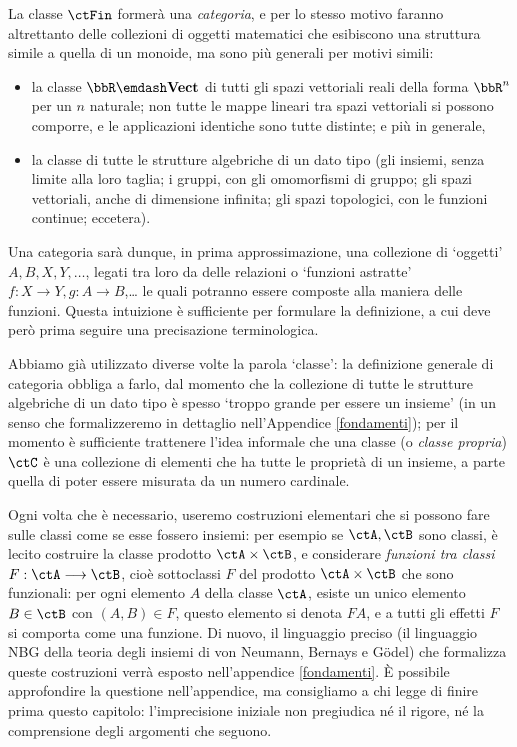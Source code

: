 \begin{example}
	La classe \(\ctFin\) formerà una \emph{categoria}, e per lo stesso motivo faranno altrettanto delle collezioni di oggetti matematici che esibiscono una struttura simile a quella di un monoide, ma sono più generali per motivi simili:
	\begin{itemize}
		\item {} la classe \(\bbR\emdash\ctVect\) di tutti gli spazi vettoriali reali della forma \(\bbR^n\) per un \(n\) %
		      naturale; non tutte le mappe lineari tra spazi vettoriali si possono comporre, e le applicazioni identiche sono tutte distinte; e più in generale,
		\item la classe di tutte le strutture algebriche di un dato tipo (gli insiemi, senza limite alla loro taglia; i gruppi, con gli omomorfismi di gruppo; gli spazi vettoriali, anche di dimensione infinita; gli spazi topologici, con le funzioni continue; eccetera).
	\end{itemize}
\end{example}
Una categoria sarà dunque, in prima approssimazione, una collezione di `oggetti' \(A,B,X,Y,\dots\), legati tra loro da delle relazioni o `funzioni astratte' \(f : X\to Y, g : A\to B\),\dots{} le quali potranno essere composte alla maniera delle funzioni. Questa intuizione è sufficiente per formulare la definizione, a cui deve però prima seguire una precisazione terminologica.
\begin{remark}
	Abbiamo già utilizzato diverse volte la parola `classe': la definizione generale di categoria obbliga a farlo, dal momento che la collezione di tutte le strutture algebriche di un dato tipo è spesso `troppo grande per essere un insieme' (in un senso che formalizzeremo in dettaglio nell'Appendice \ref{fondamenti}); per il momento è sufficiente trattenere l'idea informale che una classe (o \emph{classe propria}) \(\ctC\) è una collezione di elementi che ha tutte le proprietà di un insieme, a parte quella di poter essere misurata da un numero cardinale.

	Ogni volta che è necessario, useremo costruzioni elementari che si possono fare sulle classi come se esse fossero insiemi: per esempio se \(\ctA,\ctB\) sono classi, è lecito costruire la classe prodotto \(\ctA\times\ctB\), e considerare \emph{funzioni tra classi} \(F : \ctA\fun\ctB\), cioè sottoclassi \(F\) del prodotto \(\ctA\times\ctB\) che sono funzionali: per ogni elemento \(A\) della classe \(\ctA\), esiste un unico elemento \(B\in\ctB\) con \((A,B)\in F\), questo elemento si denota \(FA\), e a tutti gli effetti \(F\) si comporta come una funzione. Di nuovo, il linguaggio preciso (il linguaggio \textsf{NBG} della teoria degli insiemi di von Neumann, Bernays e G\"odel) che formalizza queste costruzioni verrà esposto nell'appendice \ref{fondamenti}. \`E possibile approfondire la questione nell'appendice, ma consigliamo a chi legge di finire prima questo capitolo: l'imprecisione iniziale non pregiudica né il rigore, né la comprensione degli argomenti che seguono.
\end{remark}
